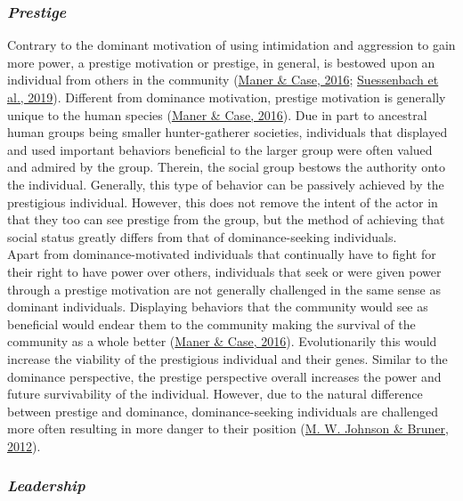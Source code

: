 \documentclass[
  donotrepeattitle,doc, 12pt, a4paper,floatsintext]{apa7}
\begin{document}
\hypertarget{prestige}{%
\subsubsection{\texorpdfstring{\emph{Prestige}}{Prestige}}\label{prestige}}

Contrary to the dominant motivation of using intimidation and aggression to gain more power, a prestige motivation or prestige, in general, is bestowed upon an individual from others in the community (\protect\hyperlink{ref-maner2016}{Maner \& Case, 2016}; \protect\hyperlink{ref-suessenbach2019}{Suessenbach et al., 2019}). Different from dominance motivation, prestige motivation is generally unique to the human species (\protect\hyperlink{ref-maner2016}{Maner \& Case, 2016}). Due in part to ancestral human groups being smaller hunter-gatherer societies, individuals that displayed and used important behaviors beneficial to the larger group were often valued and admired by the group. Therein, the social group bestows the authority onto the individual. Generally, this type of behavior can be passively achieved by the prestigious individual. However, this does not remove the intent of the actor in that they too can see prestige from the group, but the method of achieving that social status greatly differs from that of dominance-seeking individuals.\\

Apart from dominance-motivated individuals that continually have to fight for their right to have power over others, individuals that seek or were given power through a prestige motivation are not generally challenged in the same sense as dominant individuals. Displaying behaviors that the community would see as beneficial would endear them to the community making the survival of the community as a whole better (\protect\hyperlink{ref-maner2016}{Maner \& Case, 2016}). Evolutionarily this would increase the viability of the prestigious individual and their genes. Similar to the dominance perspective, the prestige perspective overall increases the power and future survivability of the individual. However, due to the natural difference between prestige and dominance, dominance-seeking individuals are challenged more often resulting in more danger to their position (\protect\hyperlink{ref-johnson2012}{M. W. Johnson \& Bruner, 2012}).

\hypertarget{leadership}{%
\subsubsection{\texorpdfstring{\emph{Leadership}}{Leadership}}\label{leadership}}
\end{document}
